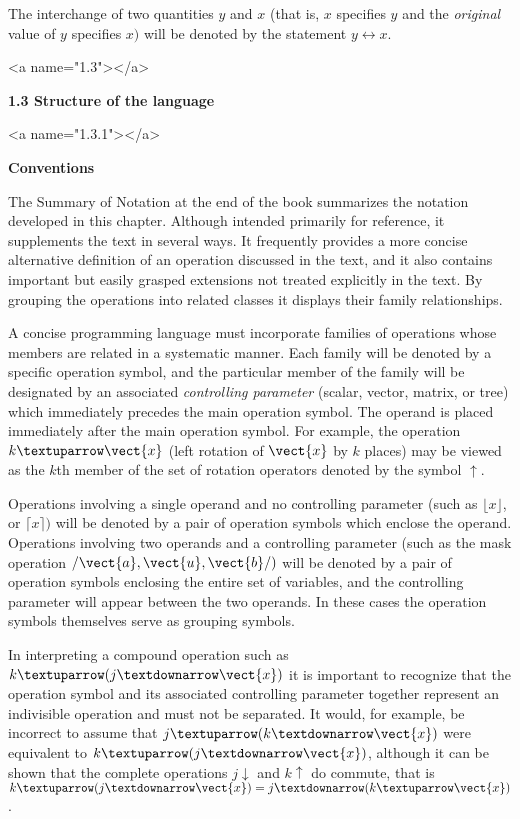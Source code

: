 \par The interchange of two quantities $y$ and $x$ (that is, $x$ specifies $y$ and the \textit{original} value of $y$ specifies $x)$ will be denoted by the statement $y \leftrightarrow x$.

<a name="1.3"></a>
\par \textbf{1.3 Structure of the language}

<a name="1.3.1"></a>
\par \textbf{Conventions}

\par The Summary of Notation at the end of the book summarizes the notation developed in this chapter. Although intended primarily for reference, it supplements the text in several ways. It frequently provides a more concise alternative definition of an operation discussed in the text, and it also contains important but easily grasped extensions not treated explicitly in the text. By grouping the operations into related classes it displays their family relationships.

\par A concise programming language must incorporate families of operations whose members are related in a systematic manner. Each family will be denoted by a specific operation symbol, and the particular member of the family will be designated by an associated \textit{controlling parameter} (scalar, vector, matrix, or tree) which immediately precedes the main operation symbol. The operand is placed immediately after the main operation symbol. For example, the operation $k ↑ \vect{x}$ (left rotation of $\vect{x}$ by $k$ places) may be viewed as the $k$th member of the set of rotation operators denoted by the symbol $↑$.

\par Operations involving a single operand and no controlling parameter (such as $⌊x⌋$, or $⌈x⌉)$ will be denoted by a pair of operation symbols which enclose the operand. Operations involving two operands and a controlling parameter (such as the mask operation $/\vect{a}, \vect{u}, \vect{b}/)$ will be denoted by a pair of operation symbols enclosing the entire set of variables, and the controlling parameter will appear between the two operands. In these cases the operation symbols themselves serve as grouping symbols.

\par In interpreting a compound operation such as $k ↑ (j ↓ \vect{x})$ it is important to recognize that the operation symbol and its associated controlling parameter together represent an indivisible operation and must not be separated. It would, for example, be incorrect to assume that $j ↑ (k ↓ \vect{x})$ were equivalent to $k ↑ (j ↓ \vect{x})$, although it can be shown that the complete operations $j ↓$ and $k ↑$ do commute, that is $k ↑ (j ↓ \vect{x}) = j ↓ (k ↑ \vect{x})$.

